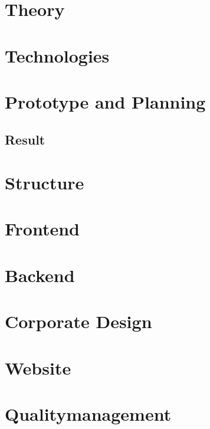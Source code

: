 \section{Theory}
\def \kapitelautor {Christoph Führer}

\section{Technologies}
\def \kapitelautor {Christoph Führer}

\section{Prototype and Planning} %
\def \kapitelautor {Erik Ritschl}
\subsection{Result} %

\section{Structure}
\def \kapitelautor {Clemens Stadlbauer}

\section{Frontend}
%
\section{Backend}
%

\section{Corporate Design}
%
\section{Website}
%

\section{Qualitymanagement}
\def \kapitelautor {Julian Lorenz}
